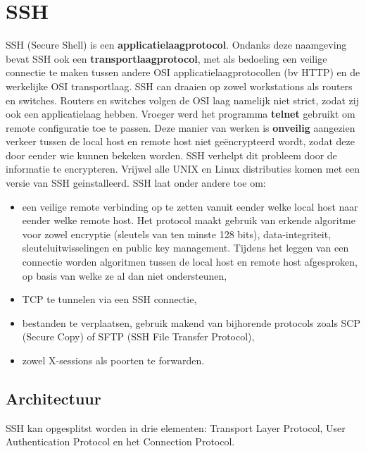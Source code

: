 \documentclass{report}
\begin{document}
	\section{SSH}
	SSH (Secure Shell) is een \textbf{applicatielaagprotocol}. Ondanks deze naamgeving bevat SSH ook een \textbf{transportlaagprotocol}, met als bedoeling een veilige connectie te maken tussen andere OSI applicatielaagprotocollen (bv HTTP) en de werkelijke OSI transportlaag. SSH can draaien op zowel workstations als routers en switches. Routers en switches volgen de OSI laag namelijk niet strict, zodat zij ook een applicatielaag hebben. Vroeger werd het programma \textbf{telnet} gebruikt om remote configuratie toe te passen. Deze manier van werken is \textbf{onveilig} aangezien verkeer tussen de local host en remote host niet geëncrypteerd wordt, zodat deze door eender wie kunnen bekeken worden. SSH verhelpt dit probleem door de informatie te encrypteren. Vrijwel alle UNIX en Linux distributies komen met een versie van SSH geinstalleerd. SSH laat onder andere toe om:
	\begin{itemize}
		\item een veilige remote verbinding op te zetten vanuit eender welke local host naar eender welke remote host. Het protocol maakt gebruik van erkende algoritme voor zowel encryptie (sleutels van ten minste 128 bits), data-integriteit, sleuteluitwisselingen en public key management. Tijdens het leggen van een connectie worden algoritmen tussen de local host en remote host afgesproken, op basis van welke ze al dan niet ondersteunen,
		\item TCP te tunnelen via een SSH connectie,
		\item bestanden te verplaatsen, gebruik makend van bijhorende protocols zoals SCP (Secure Copy) of SFTP (SSH File Transfer Protocol),
		\item zowel X-sessions als poorten te forwarden.
	\end{itemize}
	\subsection{Architectuur}
	SSH kan opgesplitst worden in drie elementen: Transport Layer Protocol, User Authentication Protocol en het Connection Protocol.
\end{document}
